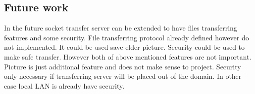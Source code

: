 \subsection{Future work}

In the future socket transfer server can be extended to have files transferring features and some security. File transferring protocol already defined however do not implemented. It could be used save elder picture. Security could be used to make safe transfer. However both of above mentioned features are not important. Picture is just additional feature and does not make sense to project. Security only necessary if transferring server will be placed out of the domain. In other case local LAN is already have security.
